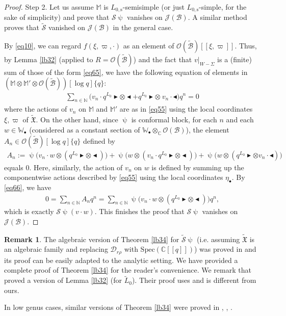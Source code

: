 \documentclass[12pt,a4paper,notitlepage]{article}
\theoremstyle{definition}
\newtheorem{rem}[df]{Remark}
\theoremstyle{plain}
\newcommand{\fk}{\mathfrak}
\newcommand{\mc}{\mathcal}
\newcommand{\wtd}{\widetilde}
\newcommand{\scr}{\mathscr}
\newcommand{\blt}{\bullet}
\newcommand{\Wbb}{\mathbb W}
\newcommand{\Mbb}{\mathbb M}
\newcommand{\Cbb}{\mathbb C}
\newcommand{\Nbb}{\mathbb N}
\newcommand{\btl}{\blacktriangleleft}
\newcommand{\btr}{\blacktriangleright}
\newcommand{\Lss}{L_{0,\mathrm{s}}}
\numberwithin{equation}{section}
\begin{document}
\begin{proof}
	
Step 2. Let us assume $\Mbb$ is $\Lss$-semisimple (or just $\Lss$-simple, for the sake of simplicity) and prove that $\mc S\uppsi$ vanishes on $\scr J(\mc B)$. A similar method proves that $\wtd{\mc S}$ vanished on $\scr J(\mc B)$ in  the general case. 

By \eqref{eq10}, we can regard $f(\xi,\varpi,\cdot)$ as an element of $\scr O(\wtd{\mc B})[[\xi,\varpi]]$. Thus, by Lemma \ref{lb32} (applied to $R=\scr O(\wtd{\mc B})$) and the fact that $v|_{W-\Sigma}$ is a (finite) sum of those of the form \eqref{eq65}, we have the following equation of elements in $(\Mbb\otimes\Mbb'\otimes \scr O(\wtd{\mc B}))[\log q]\{q\}$:
	\begin{align}
	\sum_{n\in\Nbb}\big(v_{n}\cdot q^{L_0}\btr\otimes\btl+ q^{L_0}\btr\otimes~ v_{n}\cdot\btl\big)q^{n} =0\label{eq66}
	\end{align}
	where the actions of $v_{n}$ on $\Mbb$ and $\Mbb'$ are as in \eqref{eq55} using the  local coordinates $\xi,\varpi$ of $\wtd{\fk X}$. On the other hand, since $\uppsi$ is  conformal block, for each $n$ and each $w\in\Wbb_\blt$ (considered as a constant section of $\Wbb_\blt\otimes_\Cbb\scr O(\mc B)$), the element $A_{n}\in\scr O(\wtd{\mc B})[\log q]\{q\}$ defined by
	\begin{align*}
	A_{n}:=\uppsi\big(v_{n}\cdot w\otimes (q^{L_0}\btr\otimes\btl)\big)+\uppsi\big(w\otimes (v_n\cdot q^{L_0}\btr\otimes\btl)\big)+\uppsi\big(w\otimes ( q^{L_0}\btr\otimes v_n\cdot\btl)\big)
	\end{align*}
	equals $0$. Here, similarly, the action of $v_{n}$ on $w$ is defined by summing up the componentwise actions described by \eqref{eq55} using the local coordinates $\eta_\blt$.  By \eqref{eq66}, we have
	\begin{align*}
	0=\sum_{n\in\Nbb}A_{n}q^{n}=\sum_{n\in\Nbb}\uppsi\big(v_{n}\cdot w\otimes (q^{L_0}\btr\otimes\btl)\big)q^n,
	\end{align*}
	which is exactly $\mc S\uppsi(v\cdot w)$. This finishes the proof that $\mc S\uppsi$ vanishes on $\scr J(\mc B)$.
\end{proof}



\begin{rem}
The algebraic version of  Theorem \ref{lb34} for $\wtd{\mc S}\uppsi$ (i.e. assuming $\wtd{\fk X}$ is an algebraic family and replacing $\mc D_{r\rho}$ with $\mathrm{Spec}(\Cbb[[q]])$) was proved in \cite[Thm. 8.5.1]{DGT19b} and its proof can be easily adapted to the analytic setting. We have provided a complete proof of Theorem \ref{lb34} for the reader's convenience. We remark that \cite{DGT19b}  proved a version of Lemma \ref{lb32} (for $\wtd L_0$). Their proof uses \cite[Lemma 8.7.1]{NT05} and is different from ours.

In low genus cases, similar versions of Theorem \ref{lb34} were proved in \cite[Prop. 4.3.6]{Zhu96}, \cite[Thm. 1.4]{Hua05a}, \cite[Prop. 3.6]{Hua05b}.
\end{rem}
\end{document}
